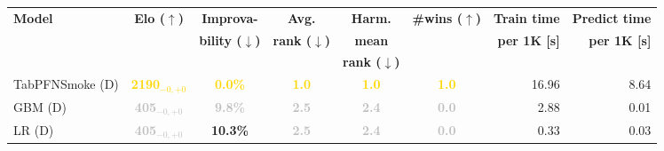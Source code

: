 \begin{tabular}{lcccccrr}
\toprule
\textbf{Model} & \textbf{Elo ($\uparrow$)} & \textbf{Improva-} & \textbf{Avg.} & \textbf{Harm.} & \textbf{\#wins ($\uparrow$)} & \textbf{Train time} & \textbf{Predict time} \\
 &  & \textbf{bility ($\downarrow$)} & \textbf{rank ($\downarrow$)} & \textbf{mean} &  & \textbf{per 1K [s]} & \textbf{per 1K [s]} \\
 &  &  &  & \textbf{rank ($\downarrow$)} &  &  &  \\
\midrule
[Smoke] TabPFNSmoke (D) & \textcolor{gold}{\textbf{2190${}_{-0,+0}$}} & \textcolor{gold}{\textbf{0.0\%}} & \textcolor{gold}{\textbf{1.0}} & \textcolor{gold}{\textbf{1.0}} & \textcolor{gold}{\textbf{1.0}} & 16.96 & 8.64 \\
[Smoke] GBM (D) & \textcolor{silver}{\textbf{405${}_{-0,+0}$}} & \textcolor{silver}{\textbf{9.8\%}} & \textcolor{silver}{\textbf{2.5}} & \textcolor{silver}{\textbf{2.4}} & \textcolor{silver}{\textbf{0.0}} & 2.88 & 0.01 \\
[Smoke] LR (D) & \textcolor{silver}{\textbf{405${}_{-0,+0}$}} & \textcolor{bronze}{\textbf{10.3\%}} & \textcolor{silver}{\textbf{2.5}} & \textcolor{silver}{\textbf{2.4}} & \textcolor{silver}{\textbf{0.0}} & 0.33 & 0.03 \\
\bottomrule
\end{tabular}